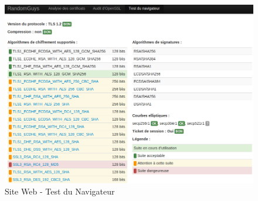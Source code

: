 \begin{figure}[H]
\begin{center}
\includegraphics[scale=0.5]{images/site_web_test_client.png}
\end{center}
\caption{Site Web - Test du Navigateur}
\label{test_client}
\end{figure}

